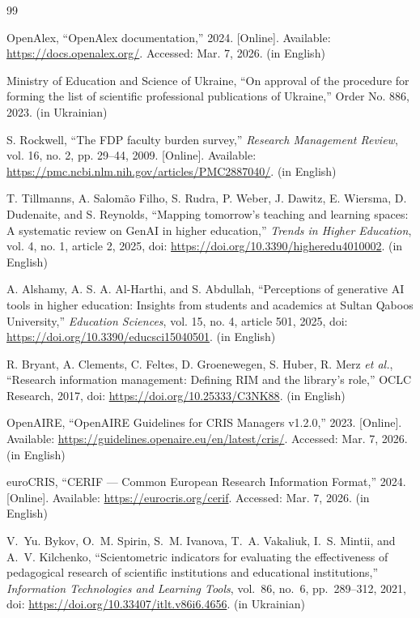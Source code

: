 \renewcommand{\refname}{REFERENCES (TRANSLATED AND TRANSLITERATED)}
\begin{thebibliography}{99}

OpenAlex, ``OpenAlex documentation,'' 2024. [Online]. Available: \url{https://docs.openalex.org/}. Accessed: Mar. 7, 2026. (in English)

Ministry of Education and Science of Ukraine, ``On approval of the procedure for forming the list of scientific professional publications of Ukraine,'' Order No. 886, 2023. (in Ukrainian)

S. Rockwell, ``The FDP faculty burden survey,'' \emph{Research Management Review}, vol. 16, no. 2, pp. 29--44, 2009. [Online]. Available: \url{https://pmc.ncbi.nlm.nih.gov/articles/PMC2887040/}. (in English)

T. Tillmanns, A. Salom{\~a}o Filho, S. Rudra, P. Weber, J. Dawitz, E. Wiersma, D. Dudenaite, and S. Reynolds, ``Mapping tomorrow's teaching and learning spaces: A systematic review on GenAI in higher education,'' \emph{Trends in Higher Education}, vol. 4, no. 1, article 2, 2025, doi: \url{https://doi.org/10.3390/higheredu4010002}. (in English)

A. Alshamy, A. S. A. Al-Harthi, and S. Abdullah, ``Perceptions of generative AI tools in higher education: Insights from students and academics at Sultan Qaboos University,'' \emph{Education Sciences}, vol. 15, no. 4, article 501, 2025, doi: \url{https://doi.org/10.3390/educsci15040501}. (in English)

R. Bryant, A. Clements, C. Feltes, D. Groenewegen, S. Huber, R. Merz \emph{et al.}, ``Research information management: Defining RIM and the library's role,'' OCLC Research, 2017, doi: \url{https://doi.org/10.25333/C3NK88}. (in English)

OpenAIRE, ``OpenAIRE Guidelines for CRIS Managers v1.2.0,'' 2023. [Online]. Available: \url{https://guidelines.openaire.eu/en/latest/cris/}. Accessed: Mar. 7, 2026. (in English)

euroCRIS, ``CERIF --- Common European Research Information Format,'' 2024. [Online]. Available: \url{https://eurocris.org/cerif}. Accessed: Mar. 7, 2026. (in English)

V.~Yu. Bykov, O.~M. Spirin, S.~M. Ivanova, T.~A. Vakaliuk, I.~S. Mintii, and A.~V. Kilchenko, ``Scientometric indicators for evaluating the effectiveness of pedagogical research of scientific institutions and educational institutions,'' \emph{Information Technologies and Learning Tools}, vol.~86, no.~6, pp.~289--312, 2021, doi: \url{https://doi.org/10.33407/itlt.v86i6.4656}. (in Ukrainian)


\end{thebibliography}
